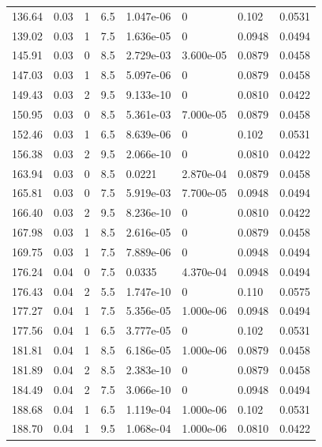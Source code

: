 \documentclass[preview]{standalone}
\begin{document}
{{{\begin{tabular}{L{1.2cm}C{1.2cm} C{0.3cm}C{0.5cm} C{1.4cm}C{1.4cm} C{1.4cm}C{1.4cm}}
  136.64  &  0.03  & 1     & 6.5 &  1.047e-06  & 0  & 0.102 &  0.0531   \\ 
  139.02  &  0.03  & 1     & 7.5 &  1.636e-05  & 0  & 0.0948 &  0.0494   \\ 
  145.91  &  0.03  & 0     & 8.5 &  2.729e-03  & 3.600e-05  & 0.0879 &  0.0458   \\ 
  147.03  &  0.03  & 1     & 8.5 &  5.097e-06  & 0  & 0.0879 &  0.0458   \\ 
  149.43  &  0.03  & 2     & 9.5 &  9.133e-10  & 0  & 0.0810 &  0.0422   \\ 
  150.95  &  0.03  & 0     & 8.5 &  5.361e-03  & 7.000e-05  & 0.0879 &  0.0458   \\ 
  152.46  &  0.03  & 1     & 6.5 &  8.639e-06  & 0  & 0.102 &  0.0531   \\ 
  156.38  &  0.03  & 2     & 9.5 &  2.066e-10  & 0  & 0.0810 &  0.0422   \\ 
  163.94  &  0.03  & 0     & 8.5 &  0.0221  & 2.870e-04  & 0.0879 &  0.0458   \\ 
  165.81  &  0.03  & 0     & 7.5 &  5.919e-03  & 7.700e-05  & 0.0948 &  0.0494   \\ 
  166.40  &  0.03  & 2     & 9.5 &  8.236e-10  & 0  & 0.0810 &  0.0422   \\ 
  167.98  &  0.03  & 1     & 8.5 &  2.616e-05  & 0  & 0.0879 &  0.0458   \\ 
  169.75  &  0.03  & 1     & 7.5 &  7.889e-06  & 0  & 0.0948 &  0.0494   \\ 
  176.24  &  0.04  & 0     & 7.5 &  0.0335  & 4.370e-04  & 0.0948 &  0.0494   \\ 
  176.43  &  0.04  & 2     & 5.5 &  1.747e-10  & 0  & 0.110 &  0.0575   \\ 
  177.27  &  0.04  & 1     & 7.5 &  5.356e-05  & 1.000e-06  & 0.0948 &  0.0494   \\ 
  177.56  &  0.04  & 1     & 6.5 &  3.777e-05  & 0  & 0.102 &  0.0531   \\ 
  181.81  &  0.04  & 1     & 8.5 &  6.186e-05  & 1.000e-06  & 0.0879 &  0.0458   \\ 
  181.89  &  0.04  & 2     & 8.5 &  2.383e-10  & 0  & 0.0879 &  0.0458   \\ 
  184.49  &  0.04  & 2     & 7.5 &  3.066e-10  & 0  & 0.0948 &  0.0494   \\ 
  188.68  &  0.04  & 1     & 6.5 &  1.119e-04  & 1.000e-06  & 0.102 &  0.0531   \\ 
  188.70  &  0.04  & 1     & 9.5 &  1.068e-04  & 1.000e-06  & 0.0810 &  0.0422   \\ 

\end{tabular}}}}
\end{document}
